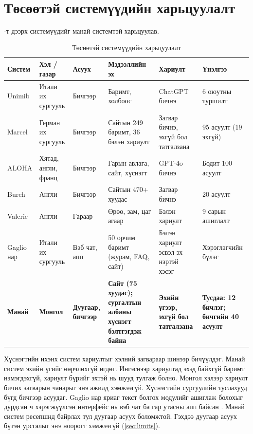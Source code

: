 \section{Төсөөтэй системүүдийн харьцуулалт}
\label{sec:lit-compare}

-т дээрх системүүдийг манай системтэй харьцуулав.

\begin{table}[H]
\centering
\caption{Төсөөтэй системүүдийн харьцуулалт}
\label{tab:similar_systems}
\small
\begin{tabular}{|p{2.2cm}|p{1.7cm}|p{1.6cm}|p{3.2cm}|p{2.4cm}|p{3.0cm}|}
\hline
\textbf{Систем} & \textbf{Хэл / газар} & \textbf{Асуух} & \textbf{Мэдээллийн эх} & \textbf{Хариулт} & \textbf{Үнэлгээ} \\
\hline
Unimib \cite{antico2024unimib} & Итали их сургууль & Бичгээр & Баримт, холбоос & ChatGPT бичнэ & 6 оюутны туршилт \\
\hline
Marcel \cite{trienes2025marcel} & Герман их сургууль & Бичгээр & Сайтын 249 баримт, 36 бэлэн хариулт & Загвар бичнэ, эхгүй бол татгалзана & 95 асуулт (19 эхгүй) \\
\hline
ALOHA \cite{tao2025aloha} & Хятад, англи, франц & Бичгээр & Гарын авлага, сайт, хүснэгт & GPT-4o бичнэ & Бодит 100 асуулт \\
\hline
Burch \cite{matic2026burch} & Англи & Бичгээр & Сайтын 470+ хуудас & Загвар бичнэ & 20 асуулт \\
\hline
Valerie \cite{gockley2005valerie} & Англи & Гараар & Өрөө, зам, цаг агаар & Бэлэн хариулт & 9 сарын ашиглалт \\
\hline
Gaglio нар \cite{gaglio2019campus} & Итали их сургууль & Вэб чат, апп & 50 орчим баримт (журам, FAQ, сайт) & Бэлэн хариулт эсвэл эх нэртэй хэсэг & Хэрэглэгчийн бүлэг \\
\hline
\textbf{Манай} & \textbf{Монгол} & \textbf{Дуугаар, бичгээр} & \textbf{Сайт (75 хуудас); сургалтын албаны хүснэгт бэлтгэгдэж байна} & \textbf{Эхийн үгээр, эхгүй бол татгалзана} & \textbf{Тусдаа: 12 бичлэг; бичгийн 40 асуулт} \\
\hline
\end{tabular}
\end{table}

Хүснэгтийн ихэнх систем хариултыг хэлний загвараар шинээр бичүүлдэг. Манай систем эхийн үгийг өөрчлөхгүй өгдөг. Ингэснээр хариултад эхэд байхгүй баримт нэмэгдэхгүй, хариулт бүрийг эхтэй нь шууд тулгаж болно. Монгол хэлээр хариулт бичих загварын чанарыг энэ ажилд хэмжээгүй. Хүснэгтийн сургуулийн туслахууд бүгд бичгээр асуудаг. Gaglio нар яриаг текст болгох модулийг ашиглаж болохыг дурдсан ч хэрэгжүүлсэн интерфейс нь вэб чат ба гар утасны апп байсан \cite{gaglio2019campus}. Манай систем ресепшнд байрлах тул дуугаар асуух боломжтой. Гэхдээ дуугаар асуух бүтэн урсгалыг энэ ноорогт хэмжээгүй (\ref{sec:limits}).

